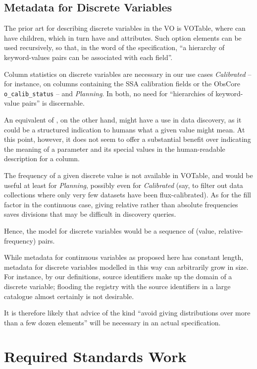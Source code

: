 \documentclass[11pt,a4paper]{ivoa}
\begin{document}
\subsection{Metadata for Discrete Variables}

The prior art for describing discrete variables in the VO is VOTable,
where  can have  children, which in turn
have  and  attributes.  Such option elements
can be used recursively, so that, in the word of the specification, 
``a hierarchy of keyword-values pairs can be associated with each
field''.

Column statistics on discrete variables are necessary in our use cases
\emph{Calibrated} -- for instance, on columns containing the SSA
calibration fields or the ObsCore \verb|o_calib_status| -- and
\emph{Planning}.  In both, no need for ``hierarchies of keyword-value
pairs'' is discernable.

An equivalent of , on the other hand, might have a use in
data discovery, as it could be a structured indication to humans what a
given value might mean.  At this point, however, it does not seem to
offer a substantial benefit over indicating the meaning of a parameter
and its special values in the human-readable description for a column.

The frequency of a given discrete value is not available in VOTable,
and would be useful at least for \emph{Planning}, possibly even for \emph{Calibrated}
(say, to filter out data collections where only very few datasets have been
flux-calibrated).  As for the fill factor in the continuous case,
giving relative rather than absolute frequencies saves divisions that may
be difficult in discovery queries.

Hence, the model for discrete variables would be a sequence of (value,
relative-frequency) pairs.

While metadata for continuous variables as proposed here has
constant length, metadata for discrete variables modelled in this way
can arbitrarily grow in
size.  For instance, by our definitions, source identifiers make up the
domain of a discrete variable; flooding the registry with the source
identifiers in a large catalogue almost certainly is not desirable.

It is therefore likely that advice of the kind ``avoid giving
distributions over more than a few dozen elements'' will be necessary in
an actual specification.


\section{Required Standards Work}
\end{document}
